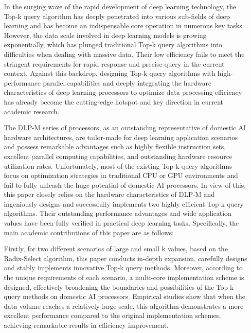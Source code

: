 \begin{abstract*}
  In the surging wave of the rapid development of deep learning technology, the Top-k query algorithm has deeply penetrated into various sub-fields of deep learning and has become an indispensable core operation in numerous key tasks. However, the data scale involved in deep learning models is growing exponentially, which has plunged traditional Top-k query algorithms into difficulties when dealing with massive data. Their low efficiency fails to meet the stringent requirements for rapid response and precise query in the current context. Against this backdrop, designing Top-k query algorithms with high-performance parallel capabilities and deeply integrating the hardware characteristics of deep learning processors to optimize data processing efficiency has already become the cutting-edge hotspot and key direction in current academic research.

  The DLP-M series of processors, as an outstanding representative of domestic AI hardware architectures, are tailor-made for deep learning application scenarios and possess remarkable advantages such as highly flexible instruction sets, excellent parallel computing capabilities, and outstanding hardware resource utilization rates. Unfortunately, most of the existing Top-k query algorithms focus on optimization strategies in traditional CPU or GPU environments and fail to fully unleash the huge potential of domestic AI processors. In view of this, this paper closely relies on the hardware characteristics of DLP-M and ingeniously designs and successfully implements two highly efficient Top-k query algorithms. Their outstanding performance advantages and wide application values have been fully verified in practical deep learning tasks. Specifically, the main academic contributions of this paper are as follows:
  
  Firstly, for two different scenarios of large and small k values, based on the Radix-Select algorithm, this paper conducts in-depth expansion, carefully designs and stably implements innovative Top-k query methods. Moreover, according to the unique requirements of each scenario, a multi-core implementation scheme is designed, effectively broadening the boundaries and possibilities of the Top-k query methods on domestic AI processors. Empirical studies show that when the data volume reaches a relatively large scale, this algorithm demonstrates a more excellent performance compared to the original implementation schemes, achieving remarkable results in efficiency improvement.
  

\end{abstract*}
